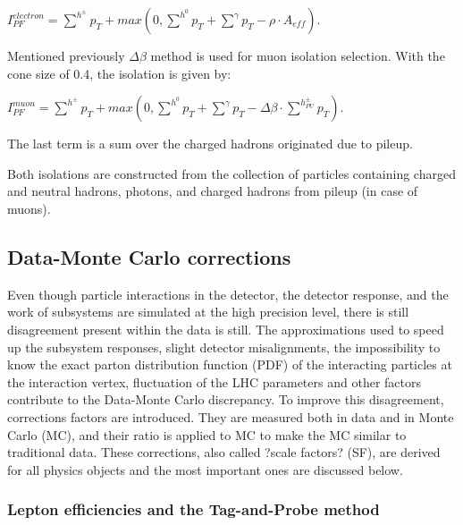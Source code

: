 $I^{electron}_{PF} = \sum^{h^\pm} p_T + max (0, \sum^{h^0} p_T + \sum^\gamma p_T - \rho \cdot A_{eff})$.

Mentioned previously $\Delta \beta$ method is used for muon isolation selection. With the cone size of 0.4, the isolation is given by:

$I^{muon}_{PF} = \sum^{h^\pm} p_T + max (0, \sum^{h^0} p_T + \sum^\gamma p_T - \Delta \beta  \cdot  \sum^{h^\pm_{PU}} p_T)$.

\noindent The last term is a sum over the charged hadrons originated due to pileup.

Both isolations are constructed from the collection of particles containing charged and neutral hadrons, photons, and charged hadrons from pileup (in case of muons).


\subsection{Data-Monte Carlo corrections}\label{sec:data_mc}

Even though particle interactions in the detector, the detector response, and the work of subsystems are simulated at the high precision level, there is still disagreement present within the data is still. The approximations used to speed up the subsystem responses, slight detector misalignments, the impossibility to know the exact parton distribution function (PDF) of the interacting particles at the interaction vertex, fluctuation of the LHC parameters and other factors contribute to the Data-Monte Carlo discrepancy. To improve this disagreement, corrections factors are introduced. They are measured both in data and in Monte Carlo (MC), and their ratio is applied to MC to make the MC similar to traditional data. These corrections, also called ?scale factors? (SF), are derived for all physics objects and the most important ones are discussed below.

\subsubsection{Lepton efficiencies and the Tag-and-Probe method}\label{sec:TnP}

